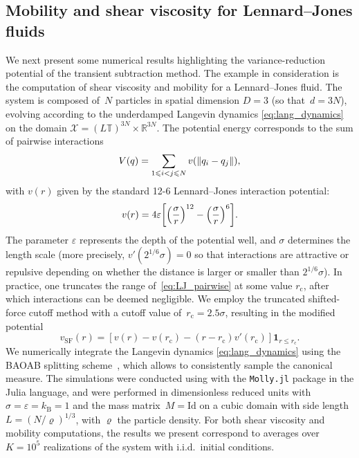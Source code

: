 \documentclass[11pt]{article}
\newcommand{\T}{\mathbb{T}}
\newcommand{\R}{\mathbb{R}}
\newcommand{\ind}{\mathbf{1}}
\renewcommand{\leq}{\leqslant}
\DeclarePairedDelimiter\norm{\lVert}{\rVert}
\DeclarePairedDelimiter\paren{\lparen}{\rparen}
\DeclarePairedDelimiter\bkt{\lbrack}{\rbrack}
\theoremstyle{definition}
\begin{document}
\subsection{Mobility and shear viscosity for Lennard--Jones fluids}
\label{subsec:num_LJ}
We next present some numerical results highlighting the variance-reduction potential of the transient subtraction method. The example in consideration is the computation of shear viscosity and mobility for a Lennard--Jones fluid. The system is composed of~$N$ particles in spatial dimension $D=3$ (so that~$d=3N$), evolving according to the underdamped Langevin dynamics \eqref{eq:lang_dynamics} on the domain $\mathcal{X} = (L\T)^{3N} \times \R^{3N}$. The potential energy corresponds to the sum of pairwise interactions
\begin{equation}
	V(q) = \sum_{1\leq i<j\leq N} v(\norm{q_i - q_j}),
\end{equation}
with $v(r)$ given by the standard 12-6 Lennard--Jones interaction potential:
\begin{equation}
	v(r) = 4\varepsilon\bkt*{\paren*{\frac{\sigma}{r}}^{12} - \paren*{\frac{\sigma}{r}}^6}.
	\label{eq:LJ_pairwise}
\end{equation}
The parameter $\varepsilon$ represents the depth of the potential well, and $\sigma$ determines the length scale (more precisely, $v'(2^{1/6}\sigma)=0$ so that interactions are attractive or repulsive depending on whether the distance is larger or smaller than $2^{1/6}\sigma$).
In practice, one truncates the range of~\eqref{eq:LJ_pairwise} at some value $r_\mathrm{c}$, after which interactions can be deemed negligible. We employ the truncated shifted-force cutoff method with a cutoff value of~$r_\mathrm{c}=2.5\sigma$, resulting in the modified potential
\begin{equation}
	v_\mathrm{SF}(r) = [v(r) - v(r_\mathrm{c}) - (r - r_\mathrm{c})v'(r_\mathrm{c})]\ind_{r\leq r_\mathrm{c}}.
\end{equation}
We numerically integrate the Langevin dynamics \eqref{eq:lang_dynamics} using the BAOAB splitting scheme~\cite{leimkuhler2013}, which allows to consistently sample the canonical measure. The simulations were conducted using with the \texttt{Molly.jl} package \cite{greener2024} in the Julia language, and were performed in dimensionless reduced units with $\sigma = \varepsilon = k_\mathrm{B} = 1$ and the mass matrix~$M = \mathrm{Id}$ on a cubic domain with side length $L = (N/\varrho)^{1/3}$, with $\varrho$ the particle density. For both shear viscosity and mobility computations, the results we present correspond to averages over $K = 10^5$ realizations of the system with i.i.d.\ initial conditions. 
\end{document}
